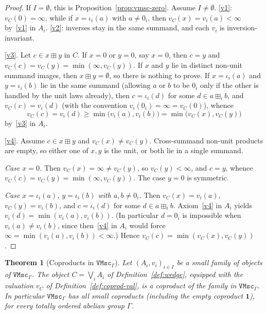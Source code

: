 \documentclass[11pt]{amsart}
\theoremstyle{plain}
\newtheorem{theorem}{Theorem}[section]
\theoremstyle{definition}
\theoremstyle{remark}
\newcommand{\VMscG}{\mathtt{VMsc}_{\Gamma}}
\begin{document}
\begin{proof}
If \(I=\emptyset\), this is Proposition~\ref{prop:vmsc-zero}. Assume \(I\neq\emptyset\).
\eqref{v1}: \(v_C(0)=\infty\), while if \(x=\iota_i(a)\) with \(a\neq 0_i\), then \(v_C(x)=v_i(a)<\infty\) by~\eqref{v1} in \(A_i\). \eqref{v2}: inverses stay in the same summand, and each \(v_i\) is inversion-invariant.

\eqref{v3}. Let \(c\in x\boxplus y\) in \(C\). If \(x=0\) or \(y=0\), say \(x=0\), then \(c=y\) and \(v_C(c)=v_C(y)=\min(\infty,v_C(y))\). If \(x\) and \(y\) lie in distinct non-unit summand images, then \(x\boxplus y=\emptyset\), so there is nothing to prove. If \(x=\iota_i(a)\) and \(y=\iota_i(b)\) lie in the same summand (allowing \(a\) or \(b\) to be \(0_i\) only if the other is handled by the unit laws already), then \(c=\iota_i(d)\) for some \(d\in a\boxplus_i b\), and \(v_C(c)=v_i(d)\) (with the convention \(v_i(0_i)=\infty=v_C(0)\)), whence
\[
v_C(c)=v_i(d)\ge\min\bigl(v_i(a),v_i(b)\bigr)=\min\bigl(v_C(x),v_C(y)\bigr)
\]
by~\eqref{v3} in \(A_i\).

\eqref{v4}. Assume \(c\in x\boxplus y\) and \(v_C(x)\neq v_C(y)\). Cross-summand non-unit products are empty, so either one of \(x,y\) is the unit, or both lie in a single summand.

\emph{Case \(x=0\).} Then \(v_C(x)=\infty\neq v_C(y)\), so \(v_C(y)<\infty\), and \(c=y\), whence \(v_C(c)=v_C(y)=\min(\infty,v_C(y))\). The case \(y=0\) is symmetric.

\emph{Case \(x=\iota_i(a)\), \(y=\iota_i(b)\) with \(a,b\neq 0_i\).} Then \(v_C(x)=v_i(a)\), \(v_C(y)=v_i(b)\), and \(c=\iota_i(d)\) for some \(d\in a\boxplus_i b\). Axiom~\eqref{v4} in \(A_i\) yields \(v_i(d)=\min(v_i(a),v_i(b))\). (In particular \(d=0_i\) is impossible when \(v_i(a)\neq v_i(b)\), since then~\eqref{v4} in \(A_i\) would force \(\infty=\min(v_i(a),v_i(b))<\infty\).) Hence \(v_C(c)=\min(v_C(x),v_C(y))\).
\end{proof}

\begin{theorem}[Coproducts in \(\VMscG\)]
\label{thm:vmsc-coprod}
Let \((A_i,v_i)_{i\in I}\) be a small family of objects of \(\VMscG\). The object \(C=\bigvee_i A_i\) of Definition~\ref{def:wedge}, equipped with the valuation \(v_C\) of Definition~\ref{def:coprod-val}, is a coproduct of the family in \(\VMscG\). In particular \(\VMscG\) has all small coproducts (including the empty coproduct \(\mathbf{1}\)), for every totally ordered abelian group \(\Gamma\).
\end{theorem}
\end{document}
